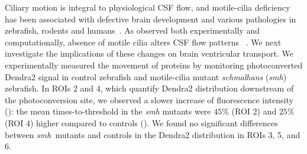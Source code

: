 \documentclass{WileyMSP-template}
\begin{document}
Ciliary motion is integral to physiological CSF flow,
and motile-cilia deficiency has been
associated with defective brain development and various
pathologies in zebrafish, rodents and humans~\cite{Eichele2020Cilia-drivenVentricle,
Olstad2019CiliaryDevelopment, Faubel2016Cilia-basedVentricles,
Guirao2010CouplingCilia, Afzelius2004CiliaRelatedDiseases,
Sawamoto2006NewBrain, Yoshiba2014RolesSymmetry,
Hirokawa2006NodalAsymmetry, Youn2018PrimaryDiseases,
Ma2024CiliaDisease, Ibanez-Tallon2002LossHydrocephalus}.  As observed both experimentally and
computationally, absence of motile cilia alters CSF flow patterns
~\cite{Olstad2019CiliaryDevelopment}. We
next investigate the implications of these changes on brain ventricular
transport. We experimentally measured the movement of proteins by
monitoring photoconverted Dendra2 signal in control zebrafish and
motile-cilia mutant \emph{schmalhans} (\emph{smh}) zebrafish.  In ROIs
2 and 4, which quantify Dendra2 distribution downstream of the
photoconversion site, we observed a slower increase of fluorescence
intensity (): the mean times-to-threshold in
the \emph{smh} mutants were $45\%$ (ROI 2) and $25\%$ (ROI 4) higher
compared to controls (). We found no
significant differences between \emph{smh} mutants and controls in the
Dendra2 distribution in ROIs 3, 5, and 6.
\end{document}
